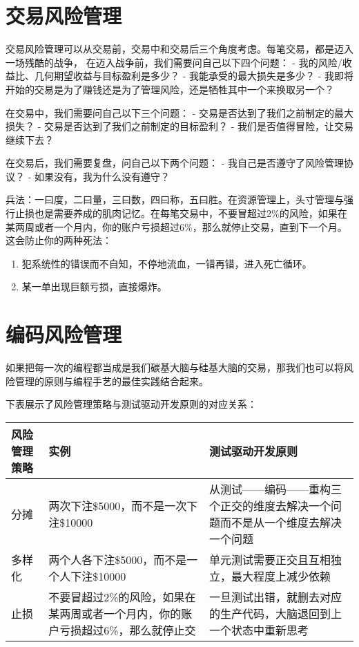 \documentclass[
  oneside]{book}
\providecommand{\tightlist}{%
  \setlength{\itemsep}{0pt}\setlength{\parskip}{0pt}}
\begin{document}
\hypertarget{ux4ea4ux6613ux98ceux9669ux7ba1ux7406}{%
\section{交易风险管理}\label{ux4ea4ux6613ux98ceux9669ux7ba1ux7406}}

交易风险管理可以从交易前，交易中和交易后三个角度考虑。每笔交易，都是迈入一场残酷的战争，
在迈入战争前，我们需要问自己以下四个问题：
- 我的风险/收益比、几何期望收益与目标盈利是多少？
- 我能承受的最大损失是多少？
- 我即将开始的交易是为了赚钱还是为了管理风险，还是牺牲其中一个来换取另一个？

在交易中，我们需要问自己以下三个问题：
- 交易是否达到了我们之前制定的最大损失？
- 交易是否达到了我们之前制定的目标盈利？
- 我们是否值得冒险，让交易继续下去？

在交易后，我们需要复盘，问自己以下两个问题：
- 我自己是否遵守了风险管理协议？
- 如果没有，我为什么没有遵守？

兵法：一曰度，二曰量，三曰数，四曰称，五曰胜。在资源管理上，头寸管理与强行止损也是需要养成的肌肉记忆。在每笔交易中，不要冒超过2\%的风险，如果在某两周或者一个月内，你的账户亏损超过6\%，那么就停止交易，直到下一个月。这会防止你的两种死法：

\begin{enumerate}
\def\labelenumi{\arabic{enumi}.}
\tightlist
\item
  犯系统性的错误而不自知，不停地流血，一错再错，进入死亡循环。
\item
  某一单出现巨额亏损，直接爆炸。
\end{enumerate}

\hypertarget{ux7f16ux7801ux98ceux9669ux7ba1ux7406}{%
\section{编码风险管理}\label{ux7f16ux7801ux98ceux9669ux7ba1ux7406}}

如果把每一次的编程都当成是我们碳基大脑与硅基大脑的交易，那我们也可以将风险管理的原则与编程手艺的最佳实践结合起来。

下表展示了风险管理策略与测试驱动开发原则的对应关系：

\begin{longtable}[]{@{}
  >{\raggedright\arraybackslash}p{}
  >{\raggedright\arraybackslash}p{}
  >{\raggedright\arraybackslash}p{}@{}}
\toprule
风险管理策略 & 实例 & 测试驱动开发原则 \\
\midrule
\endhead
分摊 & 两次下注\$5000，而不是一次下注\$10000 & 从测试------编码------重构三个正交的维度去解决一个问题而不是从一个维度去解决一个问题 \\
多样化 & 两个人各下注\$5000，而不是一个人下注\$10000 & 单元测试需要正交且互相独立，最大程度上减少依赖 \\
止损 & 不要冒超过2\%的风险，如果在某两周或者一个月内，你的账户亏损超过6\%，那么就停止交 & 一旦测试出错，就删去对应的生产代码，大脑退回到上一个状态中重新思考 \\
\bottomrule
\end{longtable}
\end{document}
